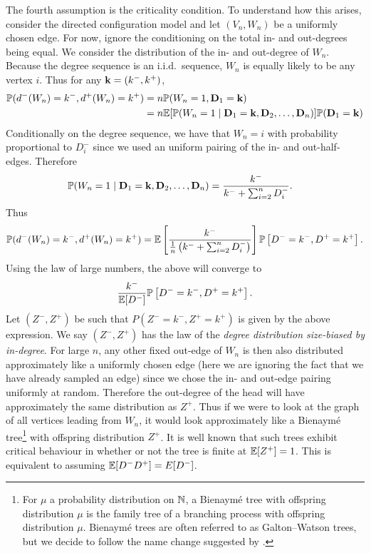 The fourth assumption is the criticality condition. To understand how this arises, consider the directed configuration model and let $(V_n, W_n)$ be a uniformly chosen edge. For now, ignore the conditioning on the total in- and out-degrees being equal. We consider the distribution of the in- and out-degree of $W_n$. Because the degree sequence is an i.i.d.\ sequence, $W_n$ is equally likely to be any vertex $i$. Thus for any ${\mathbf k} = (k^-, k^+)$,
\begin{align*}
    {\mathbb P}(d^-(W_n) = k^-, d^+(W_n) = k^+)
    &= n {\mathbb P}(W_n = 1, {\mathbf D}_1 = {\mathbf k}) \\
    &= n {\mathbb E}[{\mathbb P}(W_n = 1 \mid {\mathbf D}_1 = {\mathbf k}, {\mathbf D}_2, \ldots, {\mathbf D}_n)] {\mathbb P}({\mathbf D}_1 = {\mathbf k})
\end{align*}
Conditionally on the degree sequence, we have that $W_n = i$ with probability proportional to $D^-_i$ since we used an uniform pairing of the in- and out-half-edges. Therefore
\begin{align*}
    {\mathbb P}(W_n = 1 \mid {\mathbf D}_1 = {\mathbf k}, {\mathbf D}_2, \ldots, {\mathbf D}_n)
    &= \frac{k^-}{k^- + \sum_{i=2}^n D_i^-}.
\end{align*}
Thus
\begin{equation*}
    {\mathbb P}(d^-(W_n) = k^-, d^+(W_n) = k^+) = {\mathbb E}\left[ 
        \frac{k^-}{\frac{1}{n}\left( k^- + \sum_{i=2}^n D_i^- \right)}
    \right]
    {\mathbb P} \left[ D^- = k^-, D^+ = k^+ \right].
\end{equation*}
Using the law of large numbers, the above will converge to
\begin{equation*}
    \frac{k^-}{{\mathbb E}[D^-]} {\mathbb P}\left[ D^- = k^-, D^+ = k^+ \right].
\end{equation*}
Let $(Z^-, Z^+)$ be such that $P(Z^- = k^-, Z^+ = k^+)$ is given by the above expression. We say $(Z^-, Z^+)$ has the law of the \emph{degree distribution size-biased by in-degree}. For large $n$, any other fixed out-edge of $W_n$ is then also distributed approximately like a uniformly chosen edge (here we are ignoring the fact that we have already sampled an edge) since we chose the in- and out-edge pairing uniformly at random. Therefore the out-degree of the head will have approximately the same distribution as $Z^+$. Thus if we were to look at the graph of all vertices leading from $W_n$, it would look approximately like a Bienaymé tree\footnote{For $\mu$ a probability distribution on ${\mathbb N}$, a Bienaymé tree with offspring distribution $\mu$ is the family tree of a branching process with offspring distribution $\mu$. Bienaymé trees are often referred to as Galton--Watson trees, but we decide to follow the name change suggested by \citet{addario-berryUniversalHeightWidth2021}.} with offspring distribution $Z^+$. It is well known that such trees exhibit critical behaviour in whether or not the tree is finite at ${\mathbb E}[Z^+] = 1$. This is equivalent to assuming ${\mathbb E}[D^-D^+] = E[D^-]$.

